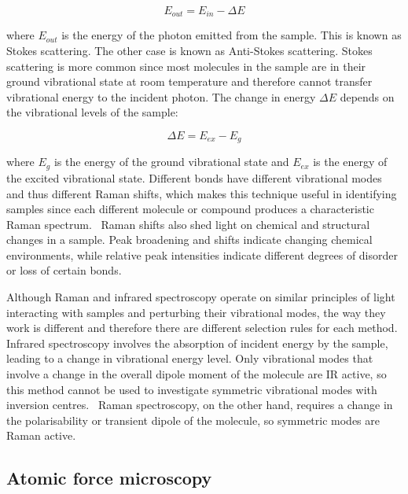 \begin{equation} \label{eq:raman_1}
E_{out} = E_{in} - \Delta E
\end{equation}

where $E_{out}$ is the energy of the photon emitted from the sample. This is known as Stokes scattering. The other case is known as Anti-Stokes scattering. Stokes scattering is more common since most molecules in the sample are in their ground vibrational state at room temperature and therefore cannot transfer vibrational energy to the incident photon. The change in energy $\Delta E$ depends on the vibrational levels of the sample:

\begin{equation} \label{eq:raman_2}
\Delta E = E_{ex} - E_{g}
\end{equation}

where $E_{g}$ is the energy of the ground vibrational state and $E_{ex}$ is the energy of the excited vibrational state. Different bonds have different vibrational modes and thus different Raman shifts, which makes this technique useful in identifying samples since each different molecule or compound produces a characteristic Raman spectrum.~\autocite{2018RS,horiba,matousek_tissue} Raman shifts also shed light on chemical and structural changes in a sample. Peak broadening and shifts indicate changing chemical environments, while relative peak intensities indicate different degrees of disorder or loss of certain bonds.~\autocite{tomasini_raman}

Although Raman and infrared spectroscopy operate on similar principles of light interacting with samples and perturbing their vibrational modes, the way they work is different and therefore there are different selection rules for each method. Infrared spectroscopy involves the absorption of incident energy by the sample, leading to a change in vibrational energy level. Only vibrational modes that involve a change in the overall dipole moment of the molecule are IR active, so this method cannot be used to investigate symmetric vibrational modes with inversion centres.~\autocite{hashimoto} Raman spectroscopy, on the other hand, requires a change in the polarisability or transient dipole of the molecule, so symmetric modes are Raman active.~\autocite{2018RS,inphotonics}

\subsection[Atomic force microscopy]{Atomic force microscopy}
\label{subsection1.2.2}

